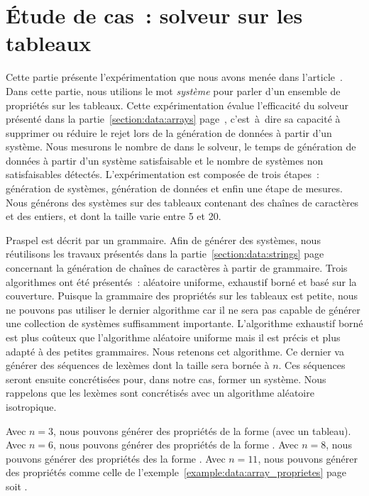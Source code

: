 \section{Étude de cas~: solveur sur les tableaux}
\label{section:experimentation:solver}

Cette partie présente l'expérimentation que nous avons menée dans
l'article~. Dans cette partie, nous utilions le mot {\em
système} pour parler d'un ensemble de propriétés sur les tableaux.  Cette
expérimentation évalue l'efficacité du solveur présenté dans la
partie~\ref{section:data:arrays} page~\pageref{section:data:arrays},
c'est~à~dire sa capacité à supprimer ou réduire le rejet lors de la génération
de données à partir d'un système. Nous mesurons le nombre de
 dans le solveur, le temps de génération de données à
partir d'un système satisfaisable et le nombre de systèmes non satisfaisables
détectés. L'expérimentation est composée de trois étapes~: génération de
systèmes, génération de données et enfin une étape de mesures. Nous générons des
systèmes sur des tableaux contenant des chaînes de caractères et des entiers, et
dont la taille varie entre 5 et 20.

Praspel est décrit par un grammaire. Afin de générer des systèmes, nous
réutilisons les travaux présentés dans la partie~\ref{section:data:strings}
page~\pageref{section:data:strings} concernant la génération de chaînes de
caractères à partir de grammaire. Trois algorithmes ont été présentés~:
aléatoire uniforme, exhaustif borné et basé sur la couverture. Puisque la
grammaire des propriétés sur les tableaux est petite, nous ne pouvons pas
utiliser le dernier algorithme car il ne sera pas capable de générer une
collection de systèmes suffisamment importante. L'algorithme exhaustif borné est
plus coûteux que l'algorithme aléatoire uniforme mais il est précis et plus
adapté à des petites grammaires. Nous retenons cet algorithme. Ce dernier va
générer des séquences de lexèmes dont la taille sera bornée à $n$. Ces séquences
seront ensuite concrétisées pour, dans notre cas, former un système. Nous
rappelons que les lexèmes sont concrétisés avec un algorithme aléatoire
isotropique.

Avec $n = 3$, nous pouvons générer des propriétés de la forme 
(avec  un tableau). Avec $n = 6$, nous pouvons générer des propriétés de
la forme . Avec $n = 8$, nous pouvons générer des propriétés des
la forme . Avec $n = 11$, nous pouvons générer des propriétés
comme celle de l'exemple~\ref{example:data:array_proprietes}
page~\pageref{example:data:array_proprietes} soit .

